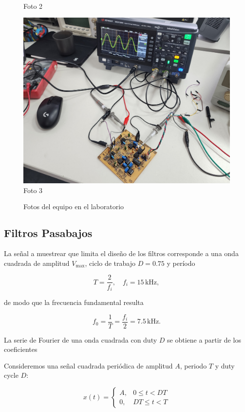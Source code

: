 \begin{figure}[H]
\begin{minipage}[b]{0.3\textwidth}
        \\[2pt] {\small Foto 2}
    \end{minipage}\hfill
    \begin{minipage}[b]{0.3\textwidth}
        \centering
        \includegraphics[width=\textwidth]{Imagenes/Medicion.jpg}
        \\[2pt] {\small Foto 3}
    \end{minipage}
    \caption{Fotos del equipo en el laboratorio}
    \label{fig:enElLabo}
\end{figure}
\subsection{Filtros Pasabajos}

La señal a muestrear que limita el diseño de los filtros corresponde 
a una onda cuadrada de amplitud $V_{\max}$, ciclo de trabajo $D = 0.75$ 
y período

\[
T = \frac{2}{f_i}, \quad f_i = 15 \,\text{kHz},
\]

de modo que la frecuencia fundamental resulta

\[
f_0 = \frac{1}{T} = \frac{f_i}{2} = 7.5 \,\text{kHz}.
\]



La serie de Fourier de una onda cuadrada con duty $D$ se obtiene a partir 
de los coeficientes

Consideremos una señal cuadrada periódica de amplitud $A$, periodo $T$ y duty cycle $D$:

\[
x(t) =
\begin{cases}
A, & 0 \le t < D T \\
0, & D T \le t < T
\end{cases}
\]

